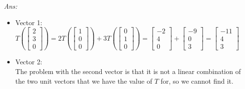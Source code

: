 \documentclass[12pt]{amsart}
\newcommand\sol[1]{
\medskip
\begin{mdframed}
\emph{Ans:\\} #1
\end{mdframed}
\medskip
}
\begin{document}
\begin{enumerate}
\sol{
  \begin{itemize}
    \item Vector 1:\\
      $T(\left[\begin{matrix} 2 \\ 3 \\ 0 \end{matrix}\right])=2T(\left[\begin{matrix} 1 \\ 0 \\ 0 \end{matrix}\right])+3T(\left[\begin{matrix} 0 \\ 1 \\ 0 \end{matrix}\right])=\left[\begin{matrix} -2 \\ 4 \\ 0 \end{matrix}\right]+\left[\begin{matrix} -9 \\ 0 \\ 3 \end{matrix}\right]=\left[\begin{matrix} -11 \\ 4 \\ 3 \end{matrix}\right]$
    \item Vector 2:\\
      The problem with the second vector is that it is not a linear combination of the two unit vectors that we have the value of $T$ for, so we cannot find it.
  \end{itemize}
}




\end{enumerate}
\end{document}
